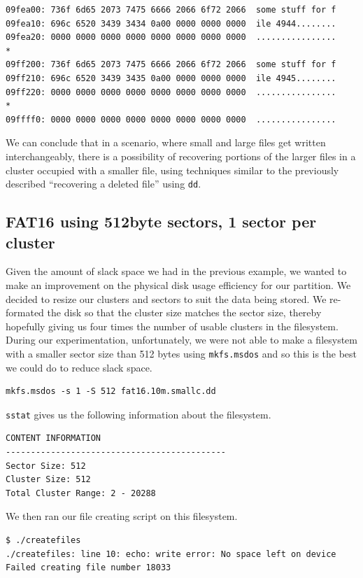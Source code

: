 \documentclass[a4paper,
    11pt,
    normalheadings,
    parindent,
    UKenglish,
    abstracton,
    ]{scrartcl}
\begin{document}
\begin{verbatim}
09fea00: 736f 6d65 2073 7475 6666 2066 6f72 2066  some stuff for f
09fea10: 696c 6520 3439 3434 0a00 0000 0000 0000  ile 4944........
09fea20: 0000 0000 0000 0000 0000 0000 0000 0000  ................
*
09ff200: 736f 6d65 2073 7475 6666 2066 6f72 2066  some stuff for f
09ff210: 696c 6520 3439 3435 0a00 0000 0000 0000  ile 4945........
09ff220: 0000 0000 0000 0000 0000 0000 0000 0000  ................
*
09ffff0: 0000 0000 0000 0000 0000 0000 0000 0000  ................
\end{verbatim}

We can conclude that in a scenario, where small and large files get written interchangeably, there is a possibility of recovering portions of the larger files in a cluster occupied with a smaller file, using techniques similar to the previously described ``recovering a deleted file'' using \texttt{dd}.


\subsection{FAT16 using 512byte sectors, 1 sector per cluster}

Given the amount of slack space we had in the previous example, we wanted to make an improvement on the  physical disk usage efficiency for our partition. We decided to resize our clusters and sectors to suit the data being stored. We re-formated the disk so that the cluster size matches the sector size, thereby hopefully giving us four times the number of usable clusters in the filesystem. During our experimentation, unfortunately, we were not able to make a filesystem with a smaller sector size than 512 bytes using \texttt{mkfs.msdos} and so this is the best we could do to reduce slack space.

\begin{verbatim}
mkfs.msdos -s 1 -S 512 fat16.10m.smallc.dd
\end{verbatim}

\texttt{sstat} gives us the following information about the filesystem.
\begin{verbatim}
CONTENT INFORMATION
--------------------------------------------
Sector Size: 512
Cluster Size: 512
Total Cluster Range: 2 - 20288
\end{verbatim}

We then ran our file creating script on this filesystem.
\begin{verbatim}
$ ./createfiles
./createfiles: line 10: echo: write error: No space left on device
Failed creating file number 18033
\end{verbatim}
\end{document}
